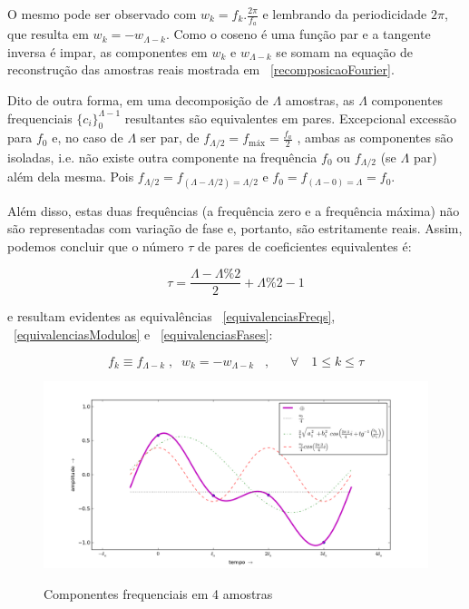  
 O mesmo pode ser observado com 
 $w_k=f_k.\frac{2\pi}{f_a}$ e lembrando da periodicidade $2\pi$, que resulta em $w_k=-w_{\Lambda-k}$. Como o coseno é uma função par e a tangente inversa é impar, as componentes em $w_k$ e $w_{\Lambda-k}$ se somam na equação de reconstrução das amostras reais mostrada em ~\ref{recomposicaoFourier}.

  Dito de outra forma, em uma decomposição de $\Lambda$ amostras, as $\Lambda$ componentes frequenciais $\{c_i\}_0^{\Lambda-1}$ resultantes
   são equivalentes em pares.
   Excepcional excessão para $f_0$ e, no caso de $\Lambda$ ser par, de $f_{\Lambda/2}=f_{\text{máx}}=\frac{f_a}{2}$ , ambas as componentes são isoladas, i.e. não existe outra componente na frequência $f_0$ ou $f_{\Lambda/2}$ (se $\Lambda$ par) além dela mesma. 
Pois $f_{\Lambda/2}=f_{(\Lambda-\Lambda/2) = \Lambda/2}$ e $f_0=f_{(\Lambda-0)=\Lambda}=f_0$.

Além disso, estas duas frequências (a frequência zero e a frequência máxima) não são representadas com variação de fase e, portanto, são estritamente reais. Assim, podemos 
   concluir que o número $\tau$ de pares de coeficientes equivalentes é:

\begin{equation}\label{coefsPareados}
\tau = \frac{\Lambda - \Lambda \% 2}{2} +\Lambda \% 2 -1
\end{equation}

e resultam evidentes as equivalências ~\ref{equivalenciasFreqs}, ~\ref{equivalenciasModulos} e ~\ref{equivalenciasFases}:

\begin{equation}\label{equivalenciasFreqs}
f_{k}\equiv f_{\Lambda-k}\;, \;\; w_{k}=-w_{\Lambda-k}\;\;\;, \quad \;\; \forall \quad 1 \leq k \leq \tau  
\end{equation}

\begin{figure}[h!]
    \centering
    \caption{Componentes frequenciais em 4 amostras}
        \includegraphics[width=\textwidth]{figuras/amostras4__}
        \label{fig:amostras4}
\end{figure}


